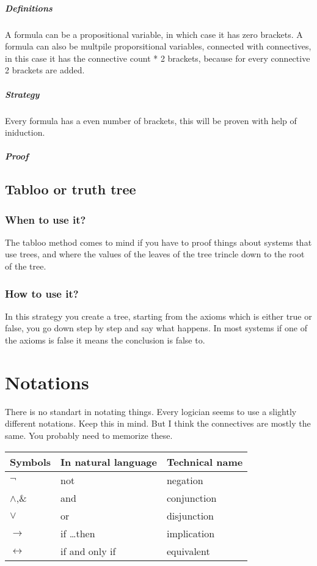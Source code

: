 \documentclass{article}
\begin{document}
\subparagraph{Definitions}
A formula can be a propositional variable, in which case it has zero brackets.
A formula can also be multpile proporsitional variables, connected with connectives,
in this case it has the connective count * 2 brackets, because for every connective
2 brackets are added.
\subparagraph{Strategy} Every formula has a even number of brackets, this will
be proven with help of iniduction.
\subparagraph{Proof}


\subsection{Tabloo or truth tree}
\subsubsection{When to use it?}
The tabloo method comes to mind if you have to proof things about systems
that use trees, and where the values of the leaves of the tree trincle down
to the root of the tree.

\subsubsection{How to use it?}
In this strategy you create a tree, starting from the axioms which is either
true or false, you go down step by step and say what happens. In most systems
if one of the axioms is false it means the conclusion is false to.

\section{Notations}
\label{notations}
There is no standart in notating things. Every logician seems to use a
slightly different notations. Keep this in mind. But I think the connectives
are mostly the same. You probably need to memorize these.

\noindent
\begin{tabular}{@{}lll@{}}
Symbols&
In natural language &
Technical name \\ \toprule
$\neg$ 			& not 				& negation \\
$\wedge$,\& 	& and 				& conjunction \\
$\vee$ 			& or 				& disjunction\\
$\to$	& if \ldots then 	& implication\\
$\leftrightarrow$	& if and only if 	& equivalent\\ \bottomrule
\end{tabular}
\end{document}
